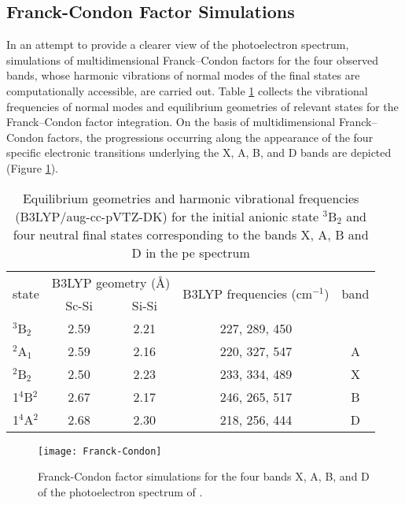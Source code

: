 \begin{refsection}
\subsection{Franck-Condon Factor Simulations}


In an attempt to provide a clearer view of the photoelectron spectrum, simulations of multidimensional Franck–Condon factors for the four observed bands, whose harmonic vibrations of normal modes of the final states are computationally accessible, are carried out. Table \ref{tbl3:freq} collects the vibrational frequencies of normal modes and equilibrium geometries of relevant states for the Franck–Condon factor integration. On the basis of multidimensional Franck–Condon factors, the progressions occurring along the appearance of the four specific electronic transitions underlying the X, A, B, and D bands are depicted (Figure \ref{fig3:FC}).



\begin{table}[htbp!]
	\centering
	\caption{Equilibrium geometries and harmonic vibrational frequencies (B3LYP/aug-cc-pVTZ-DK) for the initial anionic state $^3$B$_2$ and four neutral final states corresponding to the bands X, A, B and D in the \acrshort{pe} spectrum}
	\label{tbl3:freq}
	\begin{tabular}{@{}lcccc@{}}
	\toprule
	\multirow{2}{*}{state} & \multicolumn{2}{l}{B3LYP geometry (\AA)} & \multirow{2}{*}{B3LYP frequencies (cm$^{-1}$)} & \multirow{2}{*}{band} \\ \cmidrule(lr){2-3}
	& Sc-Si       & Si-Si    &         &                          \\ \midrule
	$^3$B$_2$     & 2.59     & 2.21    & 227, 289, 450     &       \\
	$^2$A$_1$     & 2.59     & 2.16    & 220, 327, 547     & A     \\
	$^2$B$_2$     & 2.50     & 2.23    & 233, 334, 489     & X     \\
	1$^4$B$^2$    & 2.67     & 2.17    & 246, 265, 517     & B     \\
	1$^4$A$^2$    & 2.68     & 2.30    & 218, 256, 444     & D     \\ \bottomrule
	\end{tabular}
\end{table}


\begin{figure}[htb!]
	\centering
	\texttt{[image: Franck-Condon]}
	\caption{Franck-Condon factor simulations for the four bands X, A, B, and D of the photoelectron spectrum of .}
	\label{fig3:FC}
\end{figure}






\end{refsection}
